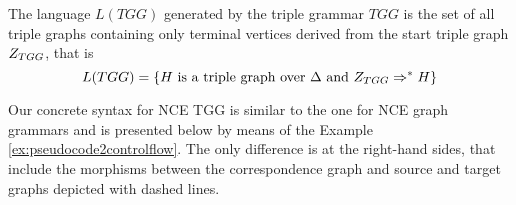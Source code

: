 \documentclass[]{report}
\begin{document}
\begin{definition}
	\label{def:tlanguage}
	The language $L(TGG)$ generated by the triple grammar $TGG$ is the set of all triple graphs containing only terminal vertices derived from the start triple graph $Z_{TGG}$, that is
	\[
	L(TGG) = \{H \text{ is a triple graph over } \Delta \text{ and } Z_{TGG} \Rightarrow^*_{} H\}
	\]
\end{definition}

Our concrete syntax for NCE TGG is similar to the one for NCE graph grammars and is presented below by means of the Example \ref{ex:pseudocode2controlflow}. The only difference is at the right-hand sides, that include the morphisms between the correspondence graph and source and target graphs depicted with dashed lines.

\end{document}
